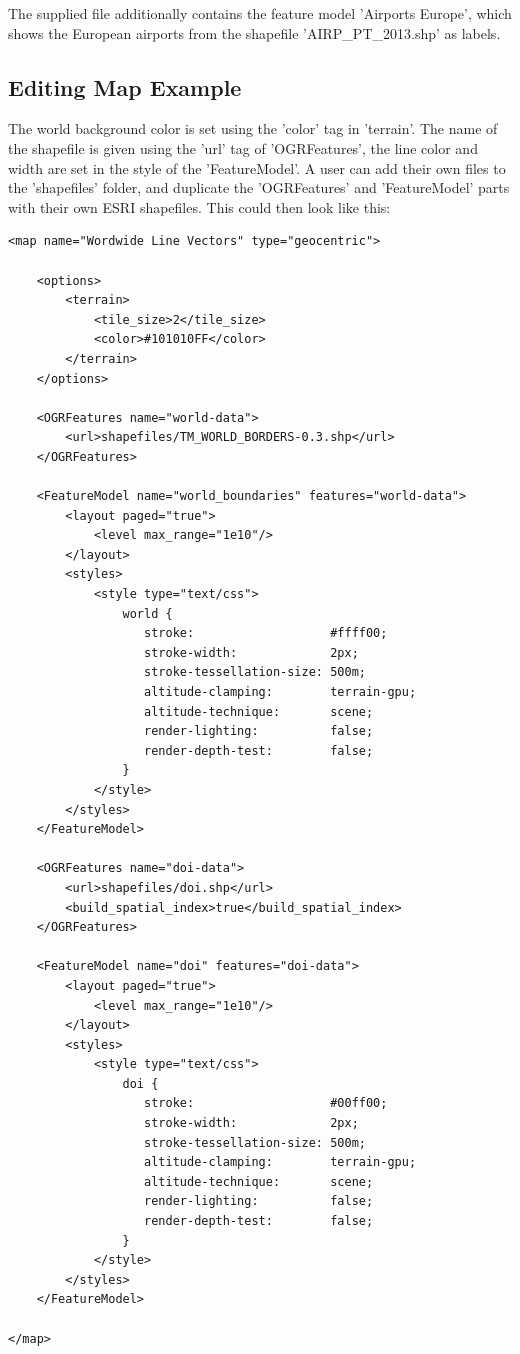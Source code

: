 The supplied file additionally contains the feature model 'Airports Europe', which shows the European airports from the shapefile 'AIRP\_PT\_2013.shp' as labels.

\subsection{Editing Map Example}

The world background color is set using the 'color' tag in 'terrain'. The name of the shapefile is given using the 'url' tag of 'OGRFeatures', the line color and width are set in the style of the 'FeatureModel'. A user can add their own files to the 'shapefiles' folder, and duplicate the 'OGRFeatures' and 'FeatureModel' parts with their own ESRI shapefiles. This could then look like this:

\begin{lstlisting}
<map name="Wordwide Line Vectors" type="geocentric">

    <options>
        <terrain>
            <tile_size>2</tile_size>
            <color>#101010FF</color>
        </terrain>
    </options>

    <OGRFeatures name="world-data">
        <url>shapefiles/TM_WORLD_BORDERS-0.3.shp</url>
    </OGRFeatures>

    <FeatureModel name="world_boundaries" features="world-data">
        <layout paged="true">
            <level max_range="1e10"/>
        </layout>
        <styles>
            <style type="text/css">
                world {
                   stroke:                   #ffff00;
                   stroke-width:             2px;
                   stroke-tessellation-size: 500m;
                   altitude-clamping:        terrain-gpu;
                   altitude-technique:       scene;
                   render-lighting:          false;
                   render-depth-test:        false;
                }
            </style>
        </styles>
    </FeatureModel>

    <OGRFeatures name="doi-data">
        <url>shapefiles/doi.shp</url>
        <build_spatial_index>true</build_spatial_index>
    </OGRFeatures>

    <FeatureModel name="doi" features="doi-data">
        <layout paged="true">
            <level max_range="1e10"/>
        </layout>
        <styles>
            <style type="text/css">
                doi {
                   stroke:                   #00ff00;
                   stroke-width:             2px;
                   stroke-tessellation-size: 500m;
                   altitude-clamping:        terrain-gpu;
                   altitude-technique:       scene;
                   render-lighting:          false;
                   render-depth-test:        false;
                }
            </style>
        </styles>
    </FeatureModel>

</map>
\end{lstlisting}

